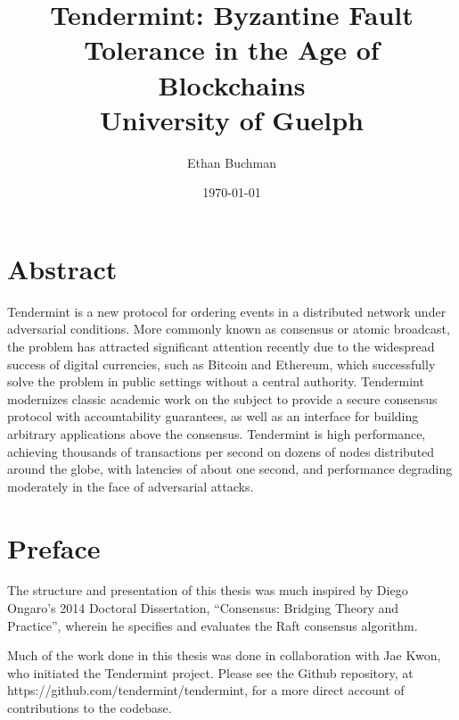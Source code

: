 
\title{
	{Tendermint: Byzantine Fault Tolerance in the Age of Blockchains}\\
	{\large University of Guelph}\\
}

\author{Ethan Buchman}
\date{\today}

\maketitle

\clearpage

\chapter*{Abstract}
Tendermint is a new protocol for ordering events in a distributed network under adversarial conditions.
More commonly known as consensus or atomic broadcast, the problem has attracted significant attention
recently due to the widespread success of digital currencies, such as Bitcoin and Ethereum,
which successfully solve the problem in public settings without a central authority.
Tendermint modernizes classic academic work on the subject to provide a secure consensus protocol with 
accountability guarantees, as well as an interface for building arbitrary applications above the consensus.
Tendermint is high performance, achieving thousands of transactions per second on dozens of nodes distributed around the globe,
with latencies of about one second, and performance degrading moderately in the face of adversarial attacks.

\thispagestyle{plain}
\par\vspace*{.35\textheight}{\centering Dedicated to Theda. \par}

\chapter*{Preface}
The structure and presentation of this thesis was much inspired by Diego Ongaro's 2014 Doctoral Dissertation, 
``Consensus: Bridging Theory and Practice'', wherein he specifies and evaluates the Raft consensus algorithm.

Much of the work done in this thesis was done in collaboration with Jae Kwon, who initiated the Tendermint project.
Please see the Github repository, at https://github.com/tendermint/tendermint, for a more direct account of contributions to the codebase.


